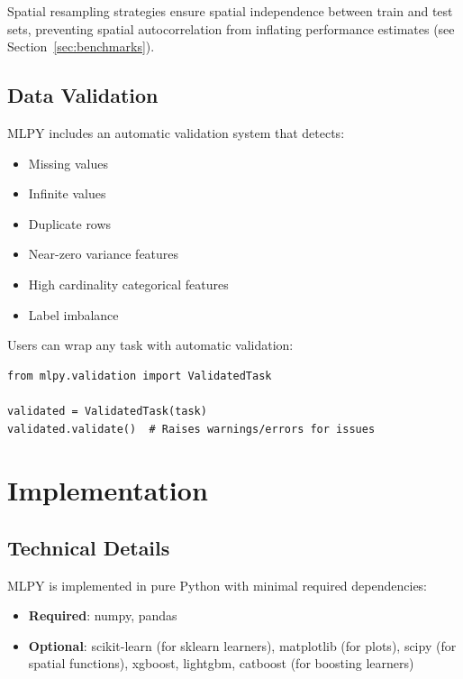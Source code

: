 \documentclass[twoside,11pt]{article}
\begin{document}
Spatial resampling strategies ensure spatial independence between train and
test sets, preventing spatial autocorrelation from inflating performance
estimates (see Section~\ref{sec:benchmarks}).

\subsection{Data Validation}

MLPY includes an automatic validation system that detects:
\begin{itemize}
  \item Missing values
  \item Infinite values
  \item Duplicate rows
  \item Near-zero variance features
  \item High cardinality categorical features
  \item Label imbalance
\end{itemize}

Users can wrap any task with automatic validation:

\begin{lstlisting}
from mlpy.validation import ValidatedTask

validated = ValidatedTask(task)
validated.validate()  # Raises warnings/errors for issues
\end{lstlisting}

\section{Implementation}
\label{sec:implementation}

\subsection{Technical Details}

MLPY is implemented in pure Python with minimal required dependencies:
\begin{itemize}
  \item \textbf{Required}: numpy, pandas
  \item \textbf{Optional}: scikit-learn (for sklearn learners), matplotlib (for plots),
        scipy (for spatial functions), xgboost, lightgbm, catboost (for boosting learners)
\end{itemize}
\end{document}
